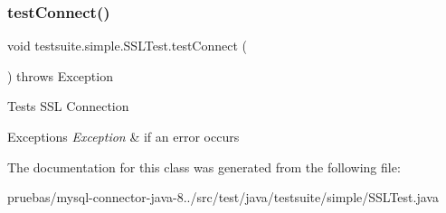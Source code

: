 \subsubsection{\texorpdfstring{test\+Connect()}{testConnect()}}
{\footnotesize\ttfamily void testsuite.\+simple.\+S\+S\+L\+Test.\+test\+Connect (\begin{DoxyParamCaption}{ }\end{DoxyParamCaption}) throws Exception}

Tests S\+SL Connection


\begin{DoxyExceptions}{Exceptions}
{\em Exception} & if an error occurs \\
\hline
\end{DoxyExceptions}


The documentation for this class was generated from the following file\+:\begin{DoxyCompactItemize}
\item 
pruebas/mysql-\/connector-\/java-\/8../src/test/java/testsuite/simple/S\+S\+L\+Test.\+java\end{DoxyCompactItemize}
